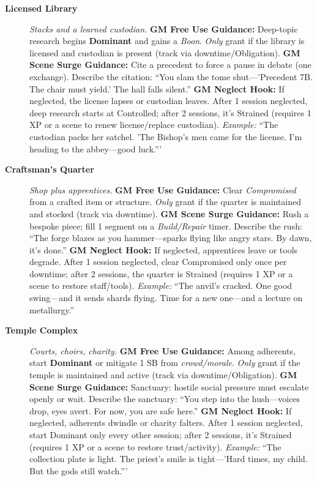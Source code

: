 \begin{description}
  \item[\textbf{Licensed Library}]   
        \emph{Stacks and a learned custodian.}  
        \textbf{GM Free Use Guidance:} Deep-topic research begins \textbf{Dominant} and gains a \emph{Boon}. \emph{Only} grant if the library is licensed and custodian is present (track via downtime/Obligation).  
        \textbf{GM Scene Surge Guidance:} Cite a precedent to force a pause in debate (one exchange). Describe the citation: ``You slam the tome shut---'Precedent 7B. The chair must yield.' The hall falls silent.''  
        \textbf{GM Neglect Hook:} If neglected, the license lapses or custodian leaves. After 1 session neglected, deep research starts at Controlled; after 2 sessions, it's Strained (requires 1 XP or a scene to renew license/replace custodian).  
        \textit{Example:} ``The custodian packs her satchel. 'The Bishop's men came for the license. I'm heading to the abbey---good luck.'''  

  \item[\textbf{Craftsman's Quarter}]   
        \emph{Shop plus apprentices.}  
        \textbf{GM Free Use Guidance:} Clear \emph{Compromised} from a crafted item or structure. \emph{Only} grant if the quarter is maintained and stocked (track via downtime).  
        \textbf{GM Scene Surge Guidance:} Rush a bespoke piece; fill 1 segment on a \emph{Build/Repair} timer. Describe the rush: ``The forge blazes as you hammer---sparks flying like angry stars. By dawn, it's done.''  
        \textbf{GM Neglect Hook:} If neglected, apprentices leave or tools degrade. After 1 session neglected, clear Compromised only once per downtime; after 2 sessions, the quarter is Strained (requires 1 XP or a scene to restore staff/tools).  
        \textit{Example:} ``The anvil's cracked. One good swing---and it sends shards flying. Time for a new one---and a lecture on metallurgy.''  

  \item[\textbf{Temple Complex}]   
        \emph{Courts, choirs, charity.}  
        \textbf{GM Free Use Guidance:} Among adherents, start \textbf{Dominant} or mitigate 1 SB from \emph{crowd/morale}. \emph{Only} grant if the temple is maintained and active (track via downtime/Obligation).  
        \textbf{GM Scene Surge Guidance:} Sanctuary: hostile social pressure must escalate openly or wait. Describe the sanctuary: ``You step into the hush---voices drop, eyes avert. For now, you are safe here.''  
        \textbf{GM Neglect Hook:} If neglected, adherents dwindle or charity falters. After 1 session neglected, start Dominant only every other session; after 2 sessions, it's Strained (requires 1 XP or a scene to restore trust/activity).  
        \textit{Example:} ``The collection plate is light. The priest's smile is tight---'Hard times, my child. But the gods still watch.'''  


\end{description}
